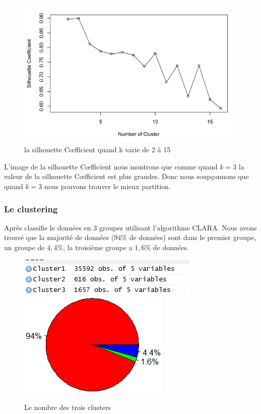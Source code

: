 \begin{figure}[H]
\centering
\includegraphics[width=0.9\linewidth]{images/sc}
\caption{la silhouette C\oe fficient quand k varie de 2 à 15}
\label{fig:sc}
\end{figure}

L'image de la silhouette C\oe fficient nous montrons que comme quand $k=3$ la valeur de la silhouette C\oe fficient est plus grandes. Donc nous soupçonnons que quand $k=3$ nous pouvons trouver le mieux partition.

\subsubsection{Le clustering}
Après classifie le données en 3 groupes utilisant l'algorithme CLARA. Nous avons trouvé que la majorité de données ($94 \%$ de données) sont dans le premier groupe, un groupe de $4,4 \%$, la troisième groupe a $1,6 \%$ de données.  

 \begin{figure}[H]
 	\flushleft
 	 \includegraphics[width=0.45\linewidth]{images/3cluster}
 	 \label{fig:3cluster}
 	\hspace{1in}	 
 	\includegraphics[width=0.325\linewidth]{images/piechart}
 	\label{fig:piechart}
 	\caption{Le nombre des trois clusters} 
 \end{figure}

